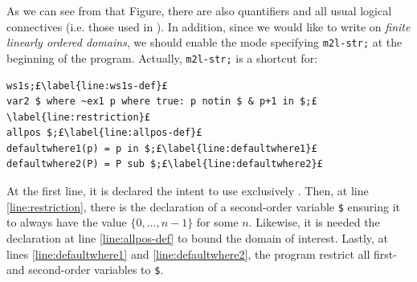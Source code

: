 As we can see from that Figure, there are also quantifiers and all usual logical connectives (i.e. those used in \FOL). In addition, since we would like to write \FOL on \textit{finite linearly ordered domains}, we should enable the \mls mode specifying \texttt{m2l-str;} at the beginning of the \MONA program. Actually, \texttt{m2l-str;} is a shortcut for:
\begin{lstlisting}[style=Mona, escapechar = £]
ws1s;£\label{line:ws1s-def}£
var2 $ where ~ex1 p where true: p notin $ & p+1 in $;£\label{line:restriction}£
allpos $;£\label{line:allpos-def}£
defaultwhere1(p) = p in $;£\label{line:defaultwhere1}£
defaultwhere2(P) = P sub $;£\label{line:defaultwhere2}£
\end{lstlisting}
At the first line, it is declared the intent to use exclusively \wsos. Then, at line \ref{line:restriction}, there is the declaration of a second-order variable \texttt{\$} ensuring it to always have the value $\{0,\dots, n-1\}$ for some $n$. Likewise, it is needed the declaration at line \ref{line:allpos-def} to bound the domain of interest. Lastly, at lines \ref{line:defaultwhere1} and \ref{line:defaultwhere2}, the program restrict all first- and second-order variables to \texttt{\$}.

